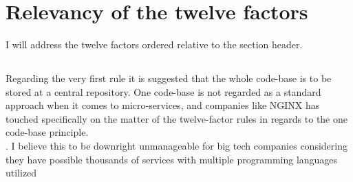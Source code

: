 \documentclass[a4paper,10pt]{article}
\begin{document}
	\begin{quote} 
		\centering 
	\cite[	I. Codebase\\
	One codebase tracked in revision control, many deploys \\
	II. Dependencies\\
	Explicitly declare and isolate dependencies\\
	III. Config\\
	Store config in the environment\\
	IV. Backing services\\
	Treat backing services as attached resources\\
	V. Build, release, run\\
	Strictly separate build and run stages\\
	VI. Processes\\
	Execute the app as one or more stateless processes\\
	VII. Port binding\\
	Export services via port binding\\
	VIII. Concurrency\\	
	Scale out via the process model\\
	IX. Disposability\\
	Maximize robustness with fast startup and graceful shutdown\\
	X. Dev/prod parity\\
	Keep development, staging, and production as similar as possible\\
	XI. Logs\\
	Treat logs as event streams\\
	XII. Admin processes\\
	Run admin/management tasks as one-off processes
	]{twelve-factor_site}
	\end{quote}
	\section{Relevancy of the twelve factors}
	I will address the twelve factors ordered relative to the section header.
	\subsection{}
	Regarding the very first rule it is suggested that the whole code-base is to be stored at a central repository. One code-base is not regarded as a standard approach when it comes to micro-services, and companies like NGINX has touched specifically on the matter of the twelve-factor rules in regards to the one code-base principle.\\
	\cite[The Twelve‑Factor App recommends one codebase per app.\\ In a micro-services architecture, the correct approach is actually one codebase per service. Additionally, we strongly recommend the use of Git as a repository, because of its rich feature set and enormous ecosystem]{microservices_twelve-fator_site}. \cite{programming_languages_big_companies}I believe this to be downright unmanageable for big tech companies considering they have possible thousands of services with multiple programming languages utilized 
	
\end{document}
